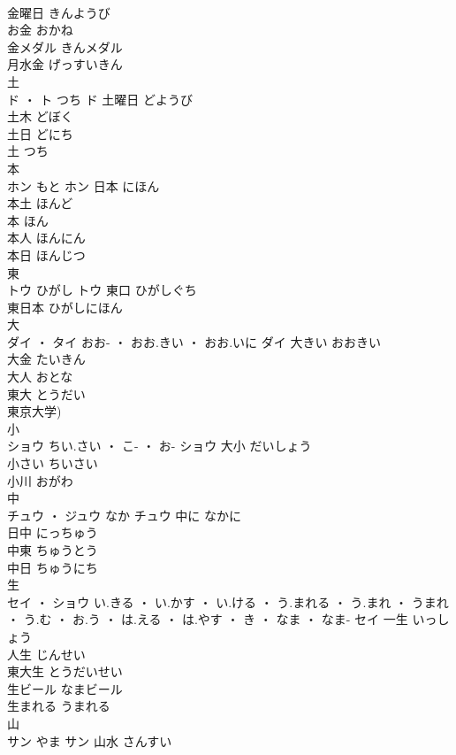 \documentclass[8pt]{extreport}
\begin{document}
\begin{CJK}{UTF8}{min}
\\	金曜日	きんようび	
\\	お金	おかね	
\\	金メダル	きんメダル	
\\	月水金	げっすいきん	
\\	土	
\\	ド ・ ト	つち	ド	土曜日	どようび	
\\	土木	どぼく	
\\	土日	どにち	
\\	土	つち	
\\	本	
\\	ホン	もと	ホン	日本	にほん	
\\	本土	ほんど	
\\	本	ほん	
\\	本人	ほんにん	
\\	本日	ほんじつ	
\\	東	
\\	トウ	ひがし	トウ	東口	ひがしぐち	
\\	東日本	ひがしにほん	
\\	大	
\\	ダイ ・ タイ	おお- ・ おお.きい ・ おお.いに	ダイ	大きい	おおきい	
\\	大金	たいきん	
\\	大人	おとな	
\\	東大	とうだい	
\\	東京大学)																	
\\	小	
\\	ショウ	ちい.さい ・ こ- ・ お-	ショウ	大小	だいしょう	
\\	小さい	ちいさい	
\\	小川	おがわ	
\\	中	
\\	チュウ ・ ジュウ	なか	チュウ	中に	なかに	
\\	日中	にっちゅう	
\\	中東	ちゅうとう	
\\	中日	ちゅうにち	
\\	生	
\\	セイ ・ ショウ	い.きる ・ い.かす ・ い.ける ・ う.まれる ・ う.まれ ・ うまれ ・ う.む ・ お.う ・ は.える ・ は.やす ・ き ・ なま ・ なま-	セイ	一生	いっしょう	
\\	人生	じんせい	
\\	東大生	とうだいせい	
\\	生ビール	なまビール	
\\	生まれる	うまれる	
\\	山	
\\	サン	やま	サン	山水	さんすい	

\end{CJK}
\end{document}
